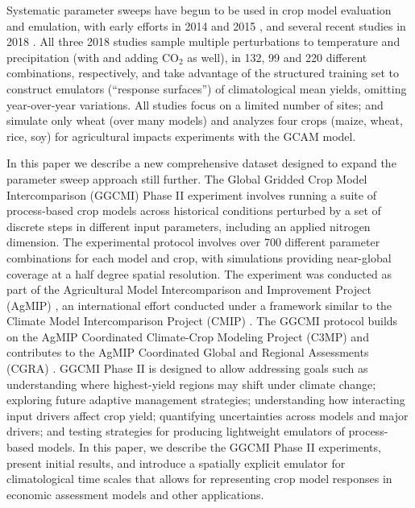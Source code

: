 \documentclass[esd, final]{copernicus} %
\begin{document}
Systematic parameter sweeps have begun to be used in crop model evaluation and emulation, with early efforts in 2014 and 2015 \citep{ruane2014, Markowski2015, Pirttioja2015}, and several recent studies in 2018 \citep{FRONZEK20182, Snyder2018, RUIZRAMOS2018}. All three 2018 studies sample multiple perturbations to temperature and precipitation (with \citet{Snyder2018} and \citet{RUIZRAMOS2018} adding CO$_2$ as well), in 132, 99 and 220 different combinations, respectively, and take advantage of the structured training set to construct emulators (``response surfaces'') of climatological mean yields, omitting year-over-year variations. All studies focus on a limited number of sites; \citet{FRONZEK20182} and \citet{RUIZRAMOS2018} simulate only wheat (over many models) and \citet{Snyder2018} analyzes four crops (maize, wheat, rice, soy) for agricultural impacts experiments with the GCAM \citep{calvin2019} model.

In this paper we describe a new comprehensive dataset designed to expand the parameter sweep approach still further. The Global Gridded Crop Model Intercomparison (GGCMI) Phase II experiment involves running a suite of process-based crop models across historical conditions perturbed by a set of discrete steps in different input parameters, including an applied nitrogen dimension. The experimental protocol involves over 700 different parameter combinations for each model and crop, with simulations providing near-global coverage at a half degree spatial resolution. The experiment was conducted as part of the Agricultural Model Intercomparison and Improvement Project (AgMIP) \citep{ROSENZWEIG2013, Rosenzweig2014}, an international effort conducted under a framework similar to the Climate Model Intercomparison Project (CMIP) \citep{Taylor2012, Eyring2016}. The GGCMI protocol builds on the AgMIP Coordinated Climate-Crop Modeling Project (C3MP) \citep{ruane2014, mcdermid2015} and contributes to the AgMIP Coordinated Global and Regional Assessments (CGRA) \citep{ruane2018, rosenzweig2018}. GGCMI Phase II is designed to allow addressing goals such as understanding where highest-yield regions may shift under climate change; exploring future adaptive management strategies; understanding how interacting input drivers affect crop yield; quantifying uncertainties across models and major drivers; and testing strategies for producing lightweight emulators of process-based models. In this paper, we describe the GGCMI Phase II experiments, present initial results, and introduce a spatially explicit emulator for climatological time scales that allows for representing crop model responses in economic assessment models and other applications.
\end{document}
